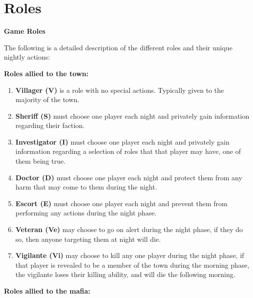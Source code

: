 \section{Roles}\label{app:A}
\begin{center}
	\textbf{Game Roles}
\end{center}
The following is a detailed description of the different roles and their unique
nightly actions:

\textbf{Roles allied to the town:}
\begin{enumerate}
	\item\textbf{Villager (V)} is a  role with no special actions. Typically
	      given
	      to the majority of the town.
	\item\textbf{Sheriff (S)} must choose one player each night and privately
	      gain
	      information regarding their faction.
	\item\textbf{Investigator (I)} must choose one player each night and
	      privately
	      gain information regarding a selection of roles that that player may have,
	      one of them being true.
	\item\textbf{Doctor (D)} must choose one player each night and protect them
	      from any harm that may come to them during the night.
	\item\textbf{Escort (E)} must choose one player each night and prevent them
	      from performing any actions during the night phase.
	\item\textbf{Veteran (Ve)} may choose to go on alert during the night
	      phase, if
	      they do so, then anyone targeting them at night will die.
	\item\textbf{Vigilante (Vi)} may choose to kill any one player during the
	      night
	      phase, if that player is revealed to be a member of the town during the
	      morning phase, the vigilante loses their killing ability, and will die the
	      following morning.
\end{enumerate}
\textbf{Roles allied to the mafia:}
